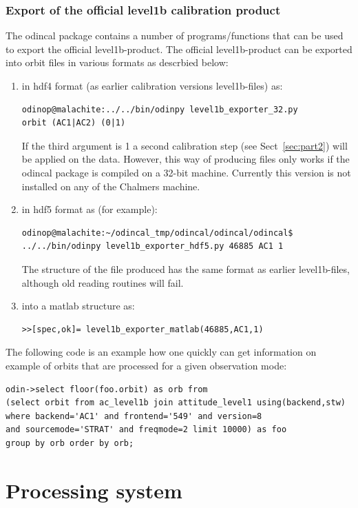 \documentclass[12pt]{article}
\begin{document}
\subsubsection{Export of the official level1b calibration product} 
\label{sec:officialexport}
The odincal package contains a number of programs/functions 
that can be used to export the official level1b-product.
The official level1b-product can be exported into
orbit files in various formats as descrbied below:
\begin{enumerate} 
\item in hdf4 format (as earlier calibration versions level1b-files) as: 
\begin{verbatim}
odinop@malachite:../../bin/odinpy level1b_exporter_32.py  
orbit (AC1|AC2) (0|1) 
\end{verbatim}
If the third argument is 1 a second calibration step
(see Sect~\ref{sec:part2}) will be applied on the data.
However, this way of producing files only works if the odincal
package is compiled on a 32-bit machine. Currently this version is
not installed on any of the Chalmers machine.
\item in hdf5 format as (for example): 

\begin{verbatim}
odinop@malachite:~/odincal_tmp/odincal/odincal/odincal$
../../bin/odinpy level1b_exporter_hdf5.py 46885 AC1 1
\end{verbatim}
The structure of the file produced has the same format as earlier
level1b-files, although old reading routines will fail.

\item into a matlab structure as:
\begin{verbatim}
>>[spec,ok]= level1b_exporter_matlab(46885,AC1,1)
\end{verbatim}
\end{enumerate}

The following code is an example how one quickly can get information
on example of orbits that are processed for a given observation mode:
\begin{verbatim}
odin->select floor(foo.orbit) as orb from  
(select orbit from ac_level1b join attitude_level1 using(backend,stw)
where backend='AC1' and frontend='549' and version=8
and sourcemode='STRAT' and freqmode=2 limit 10000) as foo
group by orb order by orb;
\end{verbatim} 



\section{Processing system}
\end{document}
